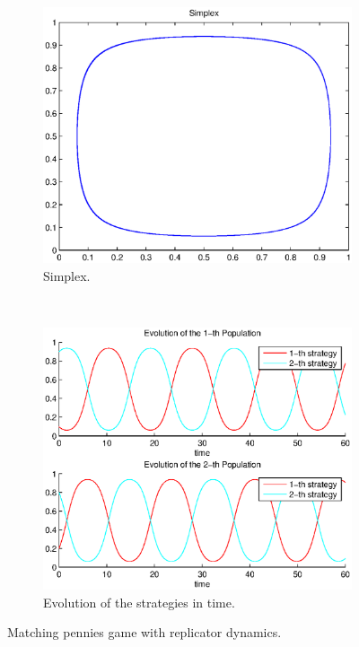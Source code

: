 \documentclass[a4paper,10pt]{article}
\begin{document}
\begin{figure}
  \centering
  \begin{subfigure}[b]{0.45\textwidth}
	  \includegraphics[width=\textwidth]{./images/test2_simplex_rd.eps}
	  \caption{Simplex.}
	  \label{fig:test2_simplex_rd}
  \end{subfigure}
  ~ 
  \begin{subfigure}[b]{0.45\textwidth}
	  \includegraphics[width=\textwidth]{./images/test2_ev_rd.eps}
	  \caption{Evolution of the strategies in time.}
	  \label{fig:test2_ev_rd}
  \end{subfigure}
  \caption{Matching pennies game with replicator dynamics.}
  \label{fig:mp_game_rd}
\end{figure}
\end{document}
